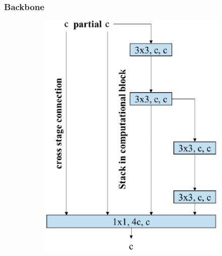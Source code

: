   \subsubsection{Backbone}

  \begin{figure}[H]
    \begin{subfigure}[c][][b]{.2\textwidth}
        \includegraphics[width=1\linewidth]{figures/elan-block.png}

\end{subfigure}
\end{figure}
